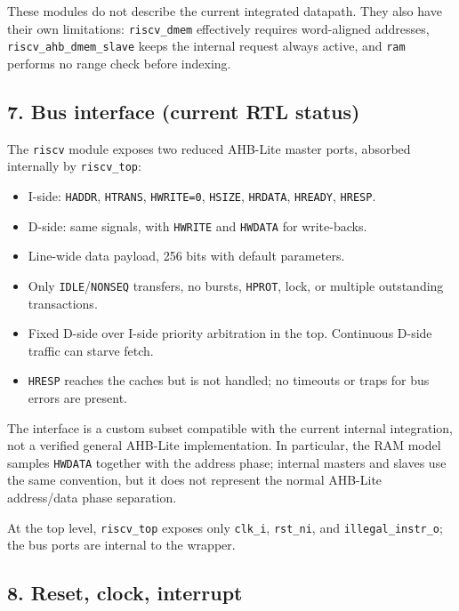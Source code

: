 \documentclass[]{article}
\providecommand{\tightlist}{%
  \setlength{\itemsep}{0pt}\setlength{\parskip}{0pt}}
\begin{document}
These modules do not describe the current integrated datapath. They also
have their own limitations: \texttt{riscv\_dmem} effectively requires
word-aligned addresses, \texttt{riscv\_ahb\_dmem\_slave} keeps the
internal request always active, and \texttt{ram} performs no range check
before indexing.

\hypertarget{7-bus-interface-current-rtl-status}{%
\subsection{7. Bus interface (current RTL
status)}\label{7-bus-interface-current-rtl-status}}

The \texttt{riscv} module exposes two reduced AHB-Lite master ports,
absorbed internally by \texttt{riscv\_top}:

\begin{itemize}
\tightlist
\item
  I-side: \texttt{HADDR}, \texttt{HTRANS}, \texttt{HWRITE=0},
  \texttt{HSIZE}, \texttt{HRDATA}, \texttt{HREADY}, \texttt{HRESP}.
\item
  D-side: same signals, with \texttt{HWRITE} and \texttt{HWDATA} for
  write-backs.
\item
  Line-wide data payload, 256 bits with default parameters.
\item
  Only \texttt{IDLE}/\texttt{NONSEQ} transfers, no bursts,
  \texttt{HPROT}, lock, or multiple outstanding transactions.
\item
  Fixed D-side over I-side priority arbitration in the top. Continuous
  D-side traffic can starve fetch.
\item
  \texttt{HRESP} reaches the caches but is not handled; no timeouts or
  traps for bus errors are present.
\end{itemize}

The interface is a custom subset compatible with the current internal
integration, not a verified general AHB-Lite implementation. In
particular, the RAM model samples \texttt{HWDATA} together with the
address phase; internal masters and slaves use the same convention, but
it does not represent the normal AHB-Lite address/data phase separation.

At the top level, \texttt{riscv\_top} exposes only \texttt{clk\_i},
\texttt{rst\_ni}, and \texttt{illegal\_instr\_o}; the bus ports are
internal to the wrapper.

\hypertarget{8-reset-clock-interrupt}{%
\subsection{8. Reset, clock, interrupt}\label{8-reset-clock-interrupt}}
\end{document}
